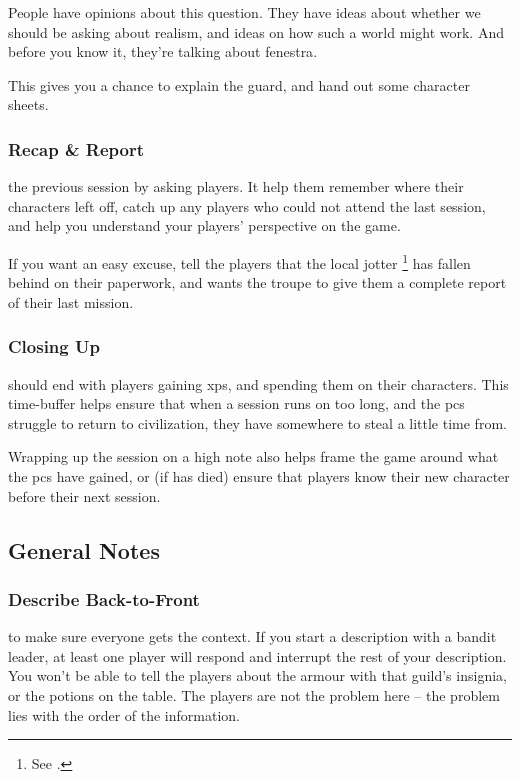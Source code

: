 \begin{multicols}{2}
People have opinions about this question.
They have ideas about whether we should be asking about realism, and ideas on how such a world might work.
And before you know it, they're talking about \gls{fenestra}.

This gives you a chance to explain the \gls{guard}, and hand out some character sheets.

\subsubsection{Recap \& Report}
the previous session by asking players.
It help them remember where their characters left off, catch up any players who could not attend the last session, and help you understand your players' perspective on the game.

If you want an easy excuse, tell the players that the local \gls{jotter}%
\footnote{See .}
has fallen behind on their paperwork, and wants the troupe to give them a complete report of their last mission.

\subsubsection{Closing Up}
should end with players gaining \glspl{xp}, and spending them on their characters.
This time-buffer helps ensure that when a session runs on too long, and the \glspl{pc} struggle to return to civilization, they have somewhere to steal a little time from.

Wrapping up the session on a high note also helps frame the game around what the \glspl{pc} have gained, or (if  has died) ensure that players know their new character before their next session.

\subsection{General Notes}

\subsubsection{Describe Back-to-Front}
to make sure everyone gets the context.
If you start a description with a bandit leader, at least one player will respond and interrupt the rest of your description.
You won't be able to tell the players about the armour with that guild's insignia, or the potions on the table.
The players are not the problem here -- the problem lies with the order of the information.


\end{multicols}
